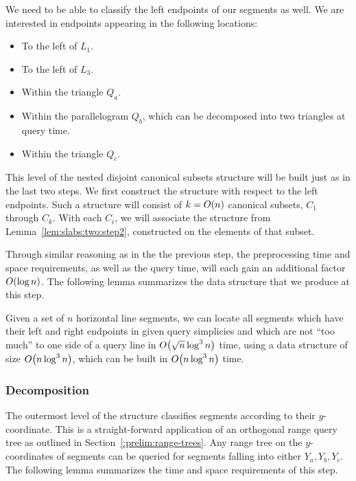 We need to be able to classify the left endpoints of our segments as well. We are interested in endpoints appearing in the following locations:

\begin{itemize}
 \item To the left of $L_1$.
 \item To the left of $L_3$.
 \item Within the triangle $Q_a$.
 \item Within the parallelogram $Q_b$, which can be decomposed into two triangles at query time.
 \item Within the triangle $Q_c$.
\end{itemize}

This level of the nested disjoint canonical subsets structure will be built just as in the last two steps.  We first construct the structure with respect to the left endpoints.  Such a structure will consist of $k = O\!\left(n\right)$ canonical subsets, $C_1$ through $C_k$. With each $C_i$, we will associate the structure from Lemma~\ref{lem:slabs:two:step2}, constructed on the elements of that subset.

Through similar reasoning as in the the previous step, the preprocessing time and space requirements, as well as the query time, will each gain an additional factor $O\!\left(\log{n}\right)$. The following lemma summarizes the data structure that we produce at this step.

\begin{lemma}
\label{lem:slabs:two:step3}
Given a set of $n$ horizontal line segments, we can locate all segments which have their left and right endpoints in given query simplicies and which are not ``too much'' to one side of a query line in $O\!\left(\sqrt{n}\log^3{n}\right)$ time, using a data structure of size $O\!\left(n\log^3{n}\right)$, which can be built in $O\!\left(n\log^3{n}\right)$ time.
\end{lemma}


\subsubsection{Decomposition}

The outermost level of the structure classifies segments according to their $y$-coordinate. This is a straight-forward application of an orthogonal range query tree as outlined in Section~\ref{:prelim:range-trees}.  Any range tree on the $y$-coordinates of segments can be queried for segments falling into either $Y_a, Y_b, Y_c$. The following lemma summarizes the time and space requirements of this step.

